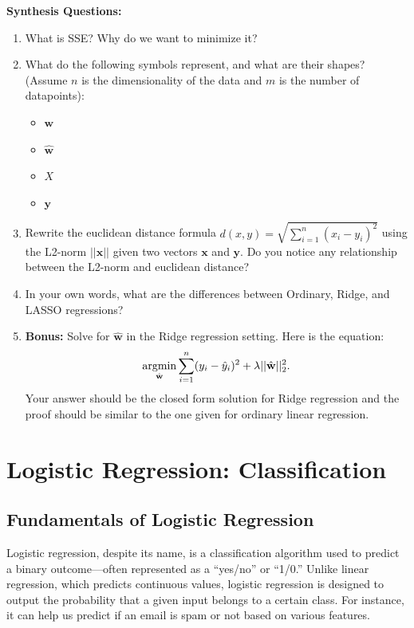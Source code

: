 \begin{questionbox}
\textbf{Synthesis Questions:}
\begin{enumerate}
    \item What is SSE? Why do we want to minimize it?
    \item What do the following symbols represent, and what are their shapes? (Assume $n$ is the dimensionality of the data and $m$ is the number of datapoints):
    \begin{itemize}
        \item $\textbf{w}$
        \item $\hat{\textbf{w}}$
        \item $X$
        \item $\textbf{y}$
    \end{itemize}
    \item Rewrite the euclidean distance formula $d(x,y) = \sqrt{\sum_{i=1}^n (x_i-y_i)^2}$ using the L2-norm $||\textbf{x}||$ given two vectors $\textbf{x}$ and $\textbf{y}$. Do you notice any relationship between the L2-norm and euclidean distance?
    \item In your own words, what are the differences between Ordinary, Ridge, and LASSO regressions?
    \item \textbf{Bonus:} Solve for $\hat{\textbf{w}}$ in the Ridge regression setting. Here is the equation:
      \[\operatorname*{argmin}_{\hat{\mathbf{w}}} \sum_{i=1}^n (y_i - \hat{y}_i)^2 + \lambda||\hat{\textbf{w}}||_2^2.\]
      Your answer should be the closed form solution for Ridge regression and the proof should be similar to the one given for ordinary linear regression.
\end{enumerate}
\end{questionbox}

\section{Logistic Regression: Classification}
\subsection{Fundamentals of Logistic Regression}
    \large Logistic regression, despite its name, is a classification algorithm used to predict a binary outcome—often represented as a “yes/no” or “1/0.” Unlike linear regression, which predicts continuous values, logistic regression is designed to output the probability that a given input belongs to a certain class. For instance, it can help us predict if an email is spam or not based on various features.

